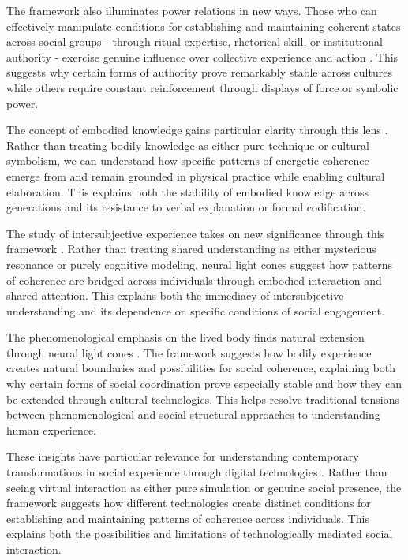 The framework also illuminates power relations in new ways. Those who can effectively manipulate conditions for establishing and maintaining coherent states across social groups - through ritual expertise, rhetorical skill, or institutional authority - exercise genuine influence over collective experience and action \cite{bourdieu1977outline}. This suggests why certain forms of authority prove remarkably stable across cultures while others require constant reinforcement through displays of force or symbolic power.

The concept of embodied knowledge gains particular clarity through this lens \cite{csordas1994embodiment}. Rather than treating bodily knowledge as either pure technique or cultural symbolism, we can understand how specific patterns of energetic coherence emerge from and remain grounded in physical practice while enabling cultural elaboration. This explains both the stability of embodied knowledge across generations and its resistance to verbal explanation or formal codification.

The study of intersubjective experience takes on new significance through this framework \cite{merleau2012phenomenology}. Rather than treating shared understanding as either mysterious resonance or purely cognitive modeling, neural light cones suggest how patterns of coherence are bridged across individuals through embodied interaction and shared attention. This explains both the immediacy of intersubjective understanding and its dependence on specific conditions of social engagement.

The phenomenological emphasis on the lived body finds natural extension through neural light cones \cite{jackson1989paths}. The framework suggests how bodily experience creates natural boundaries and possibilities for social coherence, explaining both why certain forms of social coordination prove especially stable and how they can be extended through cultural technologies. This helps resolve traditional tensions between phenomenological and social structural approaches to understanding human experience.

These insights have particular relevance for understanding contemporary transformations in social experience through digital technologies \cite{thompson2001radical}. Rather than seeing virtual interaction as either pure simulation or genuine social presence, the framework suggests how different technologies create distinct conditions for establishing and maintaining patterns of coherence across individuals. This explains both the possibilities and limitations of technologically mediated social interaction.

